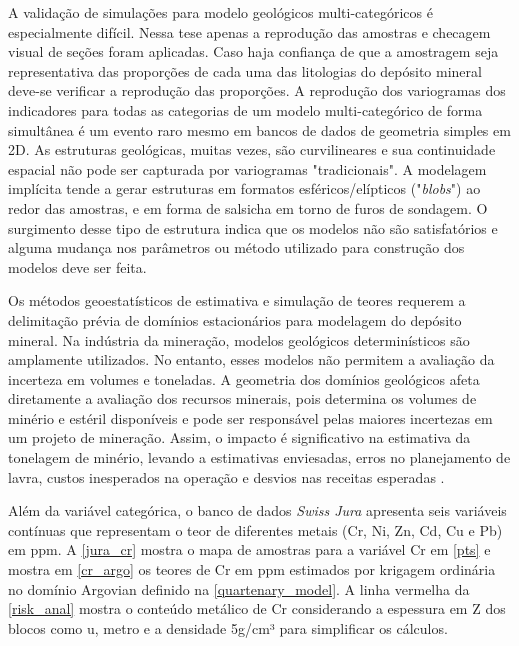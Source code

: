 A validação de simulações para modelo geológicos multi-categóricos é especialmente difícil. Nessa tese apenas a reprodução das amostras e checagem visual de seções foram aplicadas. Caso haja confiança de que a amostragem seja representativa das proporções de cada uma das litologias do depósito mineral deve-se verificar a reprodução das proporções. A reprodução dos variogramas dos indicadores para todas as categorias de um modelo multi-categórico de forma simultânea é um evento raro mesmo em bancos de dados de geometria simples em 2D. As estruturas geológicas, muitas vezes, são curvilineares e sua continuidade espacial não pode ser capturada por variogramas "tradicionais". A modelagem implícita tende a gerar estruturas em formatos esféricos/elípticos ("\textit{blobs}") ao redor das amostras, e em forma de salsicha em torno de furos de sondagem. O surgimento desse tipo de estrutura indica que os modelos não são satisfatórios e alguma mudança nos parâmetros ou método utilizado para construção dos modelos deve ser feita.

Os métodos geoestatísticos de estimativa e simulação de teores requerem a delimitação prévia de domínios estacionários para modelagem do depósito mineral. Na indústria da mineração, modelos geológicos determinísticos são amplamente utilizados. No entanto, esses modelos não permitem a avaliação da incerteza em volumes e toneladas. A geometria dos domínios geológicos afeta diretamente a avaliação dos recursos minerais, pois determina os volumes de minério e estéril disponíveis e pode ser responsável pelas maiores incertezas em um projeto de mineração. Assim, o impacto é significativo na estimativa da tonelagem de minério, levando a estimativas enviesadas, erros no planejamento de lavra, custos inesperados na operação e desvios nas receitas esperadas \cite{srivastava2005probabilistic}.

Além da variável categórica, o banco de dados \textit{Swiss Jura} apresenta seis variáveis contínuas que representam o teor de diferentes metais (Cr, Ni, Zn, Cd, Cu e Pb) em ppm. A \autoref{jura_cr} mostra o mapa de amostras para a variável Cr em \autoref{pts} e mostra em \autoref{cr_argo} os teores de Cr em ppm estimados por krigagem ordinária no domínio Argovian definido na \autoref{quartenary_model}. A linha vermelha da \autoref{risk_anal} mostra o conteúdo metálico de Cr considerando a espessura em Z dos blocos como u, metro e a densidade 5g/cm³ para simplificar os cálculos.

